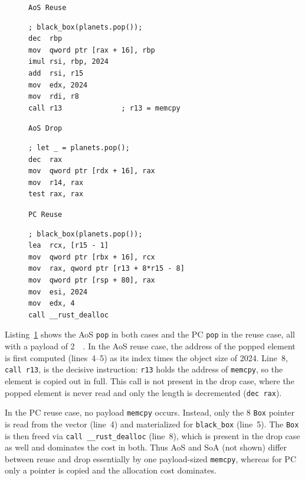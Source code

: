 \begin{figure}[htbp]
\centering
\begin{minipage}[t]{0.42\linewidth}
\centering\texttt{AoS Reuse}
\begin{lstlisting}[language={[x86masm]Assembler}, basicstyle=\scriptsize\ttfamily]
; black_box(planets.pop());
dec  rbp
mov  qword ptr [rax + 16], rbp
imul rsi, rbp, 2024
add  rsi, r15
mov  edx, 2024
mov  rdi, r8
call r13              ; r13 = memcpy
\end{lstlisting}
\end{minipage}%
\hspace{3em}%
\begin{minipage}[t]{0.42\linewidth}
\centering\texttt{AoS Drop}
\begin{lstlisting}[language={[x86masm]Assembler}, basicstyle=\scriptsize\ttfamily]
; let _ = planets.pop();
dec  rax
mov  qword ptr [rdx + 16], rax
mov  r14, rax
test rax, rax
\end{lstlisting}
\end{minipage}

\par\bigskip

\begin{minipage}[t]{0.62\linewidth}
\centering\texttt{PC Reuse}
\begin{lstlisting}[language={[x86masm]Assembler}, basicstyle=\scriptsize\ttfamily]
; black_box(planets.pop());
lea  rcx, [r15 - 1]
mov  qword ptr [rbx + 16], rcx
mov  rax, qword ptr [r13 + 8*r15 - 8]
mov  qword ptr [rsp + 80], rax
mov  esi, 2024
mov  edx, 4
call __rust_dealloc
\end{lstlisting}
\end{minipage}
\label{fig:s3:asm}
\end{figure}

Listing~\ref{fig:s3:asm} shows the \ac{AoS} \texttt{pop} in both cases and the \ac{PC} \texttt{pop} in the reuse case, all with a payload of \qty{2}{\kilo\byte}. In the \ac{AoS} reuse case, the address of the popped element is first computed (lines~4--5) as its index times the object size of \qty{2024}{\byte}. Line~8, \texttt{call~r13}, is the decisive instruction: \texttt{r13} holds the address of \texttt{memcpy}, so the element is copied out in full. This call is not present in the drop case, where the popped element is never read and only the length is decremented (\texttt{dec~rax}). 

In the \ac{PC} reuse case, no payload \texttt{memcpy} occurs. Instead, only the \qty{8}{\byte} \texttt{Box} pointer is read from the vector (line~4) and materialized for \texttt{black\_box} (line~5). The \texttt{Box} is then freed via \texttt{call~\_\_rust\_dealloc} (line~8), which is present in the drop case as well and dominates the cost in both. Thus \ac{AoS} and \ac{SoA} (not shown) differ between reuse and drop essentially by one payload-sized \texttt{memcpy}, whereas for \ac{PC} only a pointer is copied and the allocation cost dominates.

